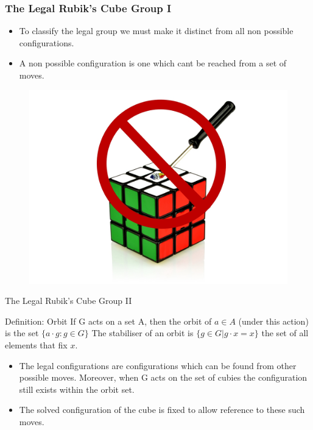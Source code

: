 \documentclass{beamer}
\begin{document}
\begin{frame}
\frametitle{The Legal Rubik's Cube Group I}
\begin{itemize}
\item To classify the legal group we must make it distinct from all non possible configurations.\\

\item A non possible configuration is one which cant be reached from a set of moves.\\
\end{itemize}

\vspace{3em}
\begin{figure}
\includegraphics[scale=.1]{no.jpg}
\end{figure}
\end{frame}



\begin{frame}[t]{The Legal Rubik's Cube Group II}
\begin{block}{Definition: Orbit}
If G acts on a set A, then the orbit of $a \in A$ (under this action) is the set $\{a \cdot g : g \in G\}$ The
stabiliser of an orbit is $\{g \in G|g \cdot x = x\}$ the set of all elements that fix $x$.
\end{block}
\begin{itemize}

\item The legal configurations are configurations which can be found from other possible moves. Moreover, when G acts on the set of cubies the configuration still exists within the orbit set.

\item The solved configuration of the cube is fixed to allow reference to these such moves.
\end{itemize}
\end{frame}
\end{document}
